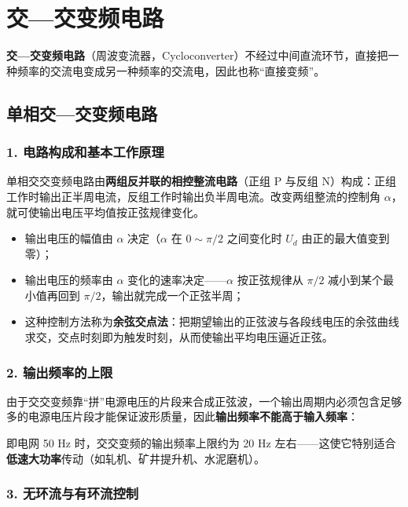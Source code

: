 \section{交—交变频电路}

\textbf{交—交变频电路}（周波变流器，Cycloconverter）不经过中间直流环节，直接把一种频率的交流电变成另一种频率的交流电，因此也称“直接变频”。

\subsection{单相交—交变频电路}

\subsubsection*{1. 电路构成和基本工作原理}

单相交交变频电路由\textbf{两组反并联的相控整流电路}（正组 P 与反组 N）构成：正组工作时输出正半周电流，反组工作时输出负半周电流。改变两组整流的控制角 $\alpha$，就可使输出电压平均值按正弦规律变化。

\begin{itemize}
  \item 输出电压的幅值由 $\alpha$ 决定（$\alpha$ 在 $0\sim\pi/2$ 之间变化时 $U_d$ 由正的最大值变到零）；
  \item 输出电压的频率由 $\alpha$ 变化的速率决定——$\alpha$ 按正弦规律从 $\pi/2$ 减小到某个最小值再回到 $\pi/2$，输出就完成一个正弦半周；
  \item 这种控制方法称为\textbf{余弦交点法}：把期望输出的正弦波与各段线电压的余弦曲线求交，交点时刻即为触发时刻，从而使输出平均电压逼近正弦。
\end{itemize}

\subsubsection*{2. 输出频率的上限}

由于交交变频靠“拼”电源电压的片段来合成正弦波，一个输出周期内必须包含足够多的电源电压片段才能保证波形质量，因此\textbf{输出频率不能高于输入频率}：


即电网 50 Hz 时，交交变频的输出频率上限约为 20 Hz 左右——这使它特别适合\textbf{低速大功率}传动（如轧机、矿井提升机、水泥磨机）。

\subsubsection*{3. 无环流与有环流控制}

